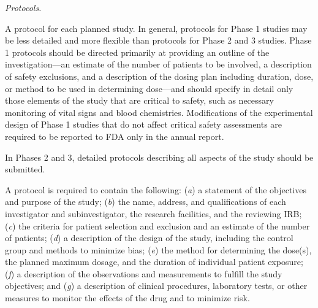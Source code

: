 \begin{description}[leftmargin=0.5cm,style=sameline]
\item[(6)] \textit{Protocols.}
\begin{description}[leftmargin=0.8cm,style=sameline]
\item[(i)] A protocol for each planned study. In general, protocols for Phase 1 studies may be less detailed and more flexible than protocols for Phase 2 and 3 studies. Phase 1 protocols should be directed primarily at providing an outline of the investigation---an estimate of the number of patients to be involved, a description of safety exclusions, and a description of the dosing plan including duration, dose, or method to be used in determining dose---and should specify in detail only those elements of the study that are critical to safety, such as necessary monitoring of vital signs and blood chemistries. Modifications of the experimental design of Phase 1 studies that do not affect critical safety assessments are required to be reported to FDA only in the annual report.
\item[(ii)] In Phases 2 and 3, detailed protocols describing all aspects of the study should be submitted.
\item[(iii)] A protocol is required to contain the following: (\textit{a}) a statement of the objectives and purpose of the study; (\textit{b}) the name, address, and qualifications of each investigator and subinvestigator, the research facilities, and the reviewing IRB; (\textit{c}) the criteria for patient selection and exclusion and an estimate of the number of patients; (\textit{d}) a description of the design of the study, including the control group and methods to minimize bias; (\textit{e}) the method for determining the dose(s), the planned maximum dosage, and the duration of individual patient exposure; (\textit{f}) a description of the observations and measurements to fulfill the study objectives; and (\textit{g}) a description of clinical procedures, laboratory tests, or other measures to monitor the effects of the drug and to minimize risk.
\end{description}


\end{description}
